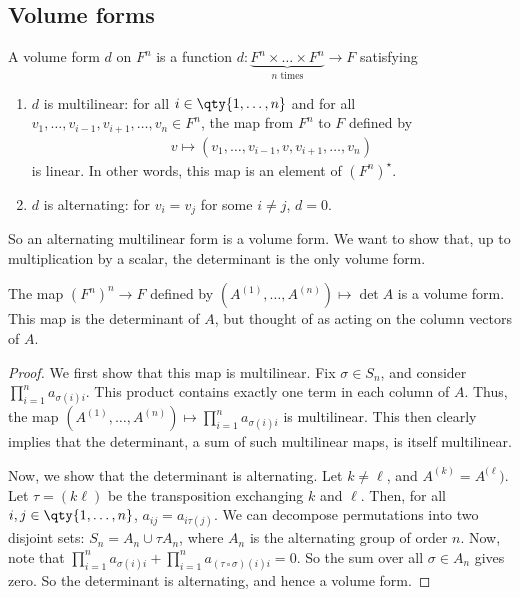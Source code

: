 \subsection{Volume forms}
\begin{definition}
	A volume form $d$ on $F^n$ is a function $d \colon \underbrace{F^n \times \dots \times F^n}_{n \text{ times}} \to F$ satisfying
	\begin{enumerate}
		\item $d$ is multilinear: for all $i \in \qty{1, \dots, n}$ and for all $v_1, \dots, v_{i-1}, v_{i+1}, \dots, v_n \in F^n$, the map from $F^n$ to $F$ defined by
		      \begin{align*}
			      v \mapsto (v_1, \dots, v_{i-1}, v, v_{i+1}, \dots, v_n)
		      \end{align*}
		      is linear.
		      In other words, this map is an element of $(F^n)^\star$.
		\item $d$ is alternating: for $v_i = v_j$ for some $i \neq j$, $d = 0$.
	\end{enumerate}
	So an alternating multilinear form is a volume form.
	We want to show that, up to multiplication by a scalar, the determinant is the only volume form.
\end{definition}
\begin{lemma}
	The map $(F^n)^n \to F$ defined by $(A^{(1)}, \dots, A^{(n)}) \mapsto \det A$ is a volume form.
	This map is the determinant of $A$, but thought of as acting on the column vectors of $A$.
\end{lemma}
\begin{proof}
	We first show that this map is multilinear.
	Fix $\sigma \in S_n$, and consider $\prod_{i=1}^n a_{\sigma(i) i}$.
	This product contains exactly one term in each column of $A$.
	Thus, the map $(A^{(1)}, \dots, A^{(n)}) \mapsto \prod_{i=1}^n a_{\sigma(i) i}$ is multilinear.
	This then clearly implies that the determinant, a sum of such multilinear maps, is itself multilinear.

	Now, we show that the determinant is alternating.
	Let $k \neq \ell$, and $A^{(k)} = A^{(\ell})$.
	Let $\tau = ( k \ell )$ be the transposition exchanging $k$ and $\ell$.
	Then, for all $i, j \in \qty{1, \dots, n}$, $a_{ij} = a_{i \tau(j)}$.
	We can decompose permutations into two disjoint sets: $S_n = A_n \cup \tau A_n$, where $A_n$ is the alternating group of order $n$.
	Now, note that $\prod_{i=1}^n a_{\sigma(i) i} + \prod_{i=1}^n a_{(\tau \circ \sigma)(i) i} = 0$.
	So the sum over all $\sigma \in A_n$ gives zero.
	So the determinant is alternating, and hence a volume form.
\end{proof}
